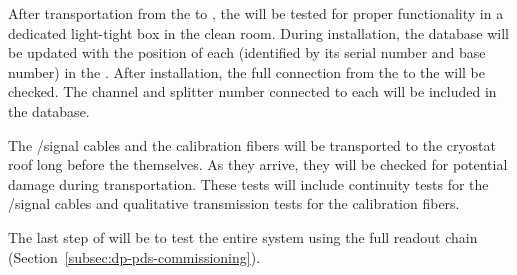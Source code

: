 After  transportation from the  to \surf, the  will be tested for proper functionality in a dedicated light-tight box in the clean room. During installation, the  database will be updated with the position of each  (identified by its serial number and base number) in the . After installation, the full connection from the  to the  will be checked. The  channel and splitter number connected to each  will be included in the  database.

The /signal cables and the calibration fibers will be transported to the cryostat roof long before the  themselves. As they arrive, they will be checked for potential damage during transportation. These tests will include continuity tests for the /signal cables and qualitative transmission tests for the calibration fibers.

The last step of  will be to test the entire system using the full readout chain (Section~\ref{subsec:dp-pds-commissioning}).
